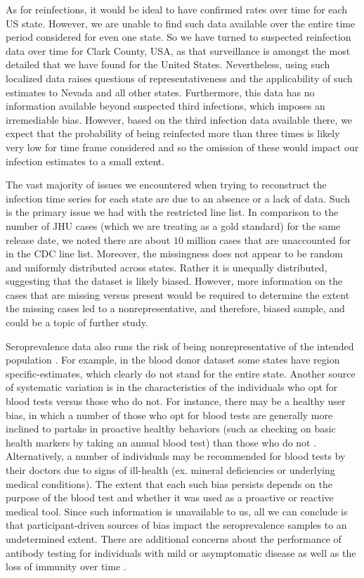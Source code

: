 \documentclass{article}
\begin{document}
As for reinfections, it would be ideal to have confirmed rates
over time for each US state. However, we are unable to find such data available
over the entire time period considered for even one state. So we have turned to
suspected reinfection data over time for Clark County, USA, as that surveillance
is amongst the most detailed that we have found for the United States.
Nevertheless, using such localized data raises questions of representativeness
and the applicability of such estimates to Nevada and all other states.
Furthermore, this data has no information available beyond suspected third
infections, which imposes an irremediable bias. However, based on the third
infection data available there, we expect that the probability of being
reinfected more than three times is likely very low for time frame considered
and so the omission of these would impact our infection estimates to a small
extent. 

The vast majority of issues we encountered when trying to reconstruct the
infection time series for each state are due to an absence or a lack of data.
Such is the primary issue we had with the restricted line list. In comparison to
the number of JHU cases (which we are treating as a gold standard) for the same
release date, we noted there are about $10$ million cases that are unaccounted
for in the CDC line list. Moreover, the missingness does not appear to be random
and uniformly distributed across states. Rather it is unequally distributed,
suggesting that the dataset is likely biased. However, more information on the
cases that are missing versus present would be required to determine the extent
the missing cases led to a nonrepresentative, and therefore, biased sample, and
could be a topic of further study.

Seroprevalence data also runs the risk of being nonrepresentative of the
intended population \citep{bajema2021estimated}. For example, in the blood donor
dataset some states have region specific-estimates, which clearly do not stand
for the entire state. Another source of systematic variation is in the
characteristics of the individuals who opt for blood tests versus those who do
not. For instance, there may be a healthy user bias, in which a number of those
who opt for blood tests are generally more inclined to partake in proactive
healthy behaviors (such as checking on basic health markers by taking an annual
blood test) than those who do not \citep{parsley2018blood}. Alternatively, a
number of individuals may be recommended for blood tests by their doctors due to
signs of ill-health (ex. mineral deficiencies or underlying medical
conditions). The extent that each such bias persists depends on the purpose of
the blood test and whether it was used as a proactive or reactive medical tool.
Since such information is unavailable to us, all we can conclude is that
participant-driven sources of bias impact the seroprevalence samples to an
undetermined extent. There are additional concerns about the performance of
antibody testing for individuals with mild or asymptomatic disease as well as
the loss of immunity over time \citep{kaku2021performance, seow2020longitudinal,
ibarrondo2020rapid}.
\end{document}
